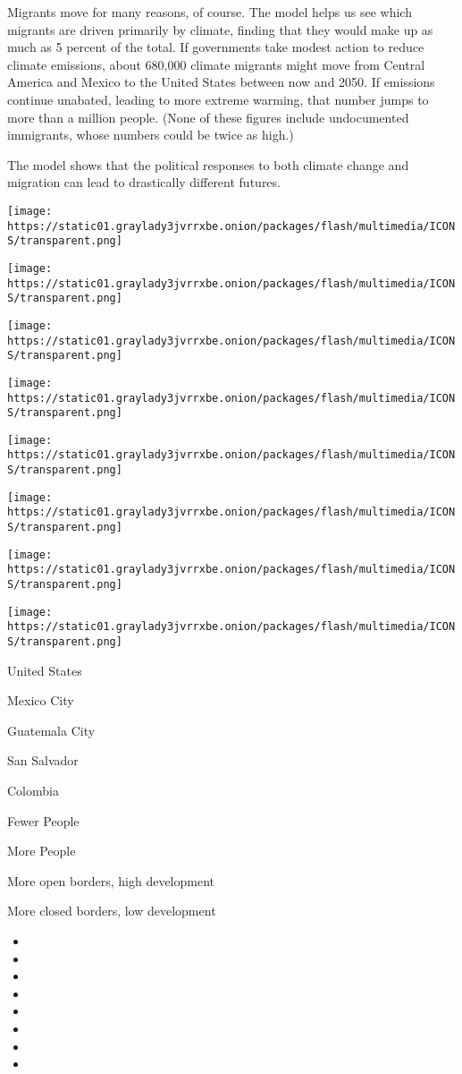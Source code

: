 Migrants move for many reasons, of course. The model helps us see which
migrants are driven primarily by climate, finding that they would make
up as much as 5 percent of the total. If governments take modest action
to reduce climate emissions, about 680,000 climate migrants might move
from Central America and Mexico to the United States between now and
2050. If emissions continue unabated, leading to more extreme warming,
that number jumps to more than a million people. (None of these figures
include undocumented immigrants, whose numbers could be twice as high.)

The model shows that the political responses to both climate change and
migration can lead to drastically different futures.

\texttt{[image: https://static01.graylady3jvrrxbe.onion/packages/flash/multimedia/ICONS/transparent.png]}

\texttt{[image: https://static01.graylady3jvrrxbe.onion/packages/flash/multimedia/ICONS/transparent.png]}

\texttt{[image: https://static01.graylady3jvrrxbe.onion/packages/flash/multimedia/ICONS/transparent.png]}

\texttt{[image: https://static01.graylady3jvrrxbe.onion/packages/flash/multimedia/ICONS/transparent.png]}

\texttt{[image: https://static01.graylady3jvrrxbe.onion/packages/flash/multimedia/ICONS/transparent.png]}

\texttt{[image: https://static01.graylady3jvrrxbe.onion/packages/flash/multimedia/ICONS/transparent.png]}

\texttt{[image: https://static01.graylady3jvrrxbe.onion/packages/flash/multimedia/ICONS/transparent.png]}

\texttt{[image: https://static01.graylady3jvrrxbe.onion/packages/flash/multimedia/ICONS/transparent.png]}

United States

Mexico City

Guatemala City

San Salvador

Colombia

Fewer People

More People

More open borders, high development

More closed borders, low development

\begin{itemize}
\item
\item
\item
\item
\item
\item
\item
\item
\end{itemize}

